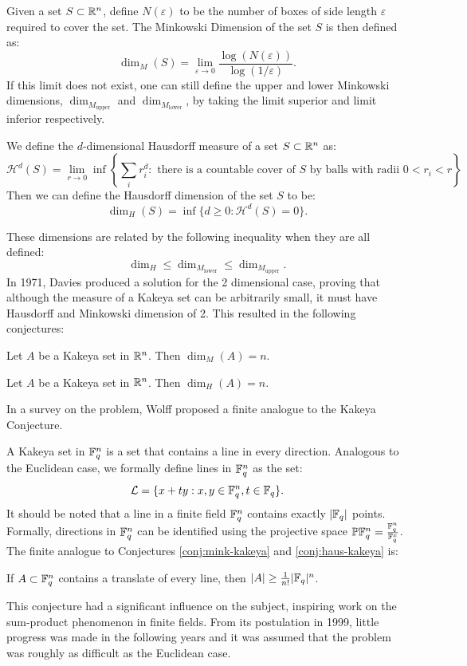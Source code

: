\begin{definition}
Given a set $S \subset \mathbb R^n$, define $N(\varepsilon)$ to be the number of boxes of side length $\varepsilon$ required to cover the set.
The Minkowski Dimension of the set $S$ is then defined as:
$$\dim_M (S) = \lim_{\varepsilon \to 0} \frac{\log( N(\varepsilon))}{\log (1/\varepsilon)}.$$
If this limit does not exist, one can still define the upper and lower Minkowski dimensions, 
$\dim_{M_{\text{upper}}}$ and $\dim_{M_{\text{lower}}}$, by taking the limit superior and limit inferior respectively.
\end{definition}
\begin{definition}
    We define the $d$-dimensional Hausdorff measure of a set $S \subset \mathbb R^n$ as: 
    $$\mathcal{H}^d(S)=\lim_{r \to 0} \inf \left\{\sum_i r_i^d:\text{ there is a countable cover of } S\text{ by balls with radii } 0 < r_i < r\right\}$$
    Then we can define the Hausdorff dimension of the set $S$ to be:
    $$\dim_H (S) = \inf \{ d \geq 0 : \mathcal{H}^d(S) = 0 \}.   $$
\end{definition}
These dimensions are related by the following inequality when they are all defined:
$$\dim_H \leq \dim_{M_{\text{lower}}} \leq \dim_{M_{\text{upper}}}.$$
In 1971, Davies produced a solution for the 2 dimensional case, proving that
although the measure of a Kakeya set can be arbitrarily small, it must have Hausdorff and Minkowski dimension of 2.\cite{davies1971some}
This resulted in the following conjectures:
\begin{conjecture}
    Let $A$ be a Kakeya set in $\mathbb R^n$. Then $\dim_M (A) = n$. \label{conj:mink-kakeya}
\end{conjecture}
\begin{conjecture}
    Let $A$ be a Kakeya set in $\mathbb R^n$. Then $\dim_H (A) = n$. \label{conj:haus-kakeya}
\end{conjecture}
In a survey on the problem, Wolff proposed a finite analogue to the Kakeya Conjecture.\cite{wolff1999recent} 

A Kakeya set in $\mathbb{ F}_q^n$ is a set that contains a line in every direction. Analogous to the Euclidean case, we formally define lines in $\mathbb{ F}_q^n$  as the set:
$$\mathcal{L} = \{x+ty : x,y \in \mathbb{ F}_q^n,  t \in \mathbb{ F}_q \}.$$
It should be noted that a line in a finite field $\mathbb{ F}_q^n$ contains exactly $|\mathbb{ F}_q|$ points.
Formally, directions in $\mathbb{ F}_q^n$ can be identified using the projective space $\mathbb{P}\mathbb{ F}_q^n  = \frac{\mathbb{ F}_q^n}{\mathbb{ F}_q^x}$.
The finite analogue to Conjectures \ref{conj:mink-kakeya} and \ref{conj:haus-kakeya} is:
\begin{theorem}
    If $A\subset \mathbb{ F}_q^n$ contains a translate of every line, then $|A| \geq \frac{1}{n!} |\mathbb{ F}_q|^n $. \label{KakeyaConjecture}
\end{theorem}
This conjecture had a significant influence on the subject, inspiring work on the sum-product phenomenon in finite fields. From its postulation in 1999,
little progress was made in the following years and it was assumed that the problem was roughly as difficult as the Euclidean case. 

